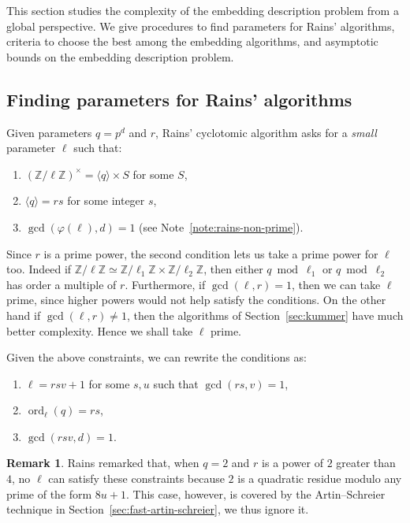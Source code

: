 \documentclass[12pt]{article}
\theoremstyle{plain}
\theoremstyle{definition}
\newtheorem*{remark}{Remark}
\DeclareMathOperator{\order}{ord} %
\def\Z{\ensuremath{\mathbb{Z}}}
\def\euler{\ensuremath{\varphi}}
\newcounter{algorithm}
\begin{document}
This section studies the complexity of the embedding description
problem from a global perspective. We give procedures to find
parameters for Rains' algorithms, criteria to choose the best among
the embedding algorithms, and asymptotic bounds on the embedding
description problem.


\subsection{Finding parameters for Rains' algorithms}

Given parameters $q=p^d$ and $r$, Rains' cyclotomic algorithm asks for
a \emph{small} parameter $\ell$ such that:
\begin{enumerate}
\item $(\Z/\ell\Z)^\times = \langle q\rangle \times S$ for some $S$,
\item $\langle q \rangle = rs$ for some integer $s$,
\item $\gcd(\euler(\ell),d)=1$ (see Note~\ref{note:rains-non-prime}).
\end{enumerate}

Since $r$ is a prime power, the second condition lets us take a prime
power for $\ell$ too. Indeed if
$\Z/\ell\Z\simeq\Z/\ell_1\Z\times\Z/\ell_2\Z$, then either
$q\bmod\ell_1$ or $q\bmod\ell_2$ has order a multiple of $r$.
Furthermore, if $\gcd(\ell,r)=1$, then we can take $\ell$ prime, since
higher powers would not help satisfy the conditions. On the other hand
if $\gcd(\ell,r)\ne1$, then the algorithms of Section~\ref{sec:kummer} have much
better complexity. Hence we shall take $\ell$ prime.

Given the above constraints, we can rewrite the conditions as:
\begin{enumerate}
\item $\ell = rsv + 1$ for some $s,u$ such that $\gcd(rs,v)=1$,
\item $\order_\ell(q) = rs$,
\item $\gcd(rsv,d)=1$.
\end{enumerate}

\begin{remark}
  Rains remarked that, when $q=2$ and $r$ is a power of $2$ greater
  than $4$, no $\ell$ can satisfy these constraints because $2$ is a
  quadratic residue modulo any prime of the form $8u+1$. This case,
  however, is covered by the Artin--Schreier technique in
  Section~\ref{sec:fast-artin-schreier}, we thus ignore it.
\end{remark}
\end{document}
